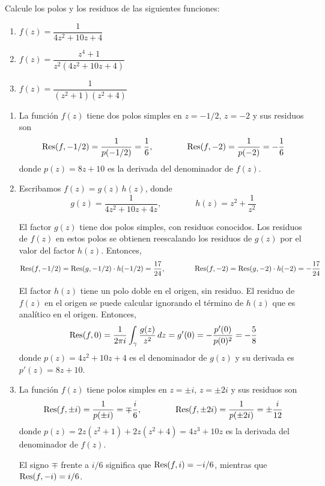 \begin{exercise}
Calcule los polos y los residuos de las siguientes funciones:
\begin{enumerate}[label=(\alph*)]
    \item $f(z) = \dfrac 1 {4z^2 + 10z + 4}$
    \item $f(z) = \dfrac {z^4 + 1} {z^2 (4z^2 + 10z + 4)}$
    \item $f(z) = \dfrac 1 {(z^2 + 1) (z^2 + 4)}$
\end{enumerate}
\end{exercise}

\begin{solution}
\leavevmode
\begin{enumerate}[label=(\alph*)]
    \item La función $f(z)$ tiene dos polos simples en $z = -1/2$, $z = -2$ y sus residuos son
    $$
    \operatorname{Res}(f, -1/2) = \frac 1 {p(-1/2)} = \frac 16, \qquad \qquad
    \operatorname{Res}(f, -2) = \frac 1 {p(-2)} = -\frac 16
    $$
    donde $p(z) = 8z + 10$ es la derivada del denominador de $f(z)$.
    
    \item Escribamos $f(z) = g(z) \, h(z)$, donde
    $$g(z) = \frac 1 {4z^2 + 10z + 4z}, \qquad \qquad h(z) = z^2 + \frac 1 {z^2}$$
    
    El factor $g(z)$ tiene dos polos simples, con residuos conocidos. Los residuos de $f(z)$ en estos polos se obtienen reescalando los residuos de $g(z)$ por el valor del factor $h(z)$. Entonces,
    $$
    \operatorname{Res}(f, -1/2) = \operatorname{Res}(g, -1/2) \cdot h(-1/2) = \frac {17} {24}, \qquad \qquad
    \operatorname{Res}(f, -2) = \operatorname{Res}(g, -2) \cdot h(-2) = -\frac {17} {24}
    $$
    
    El factor $h(z)$ tiene un polo doble en el origen, sin residuo. El residuo de $f(z)$ en el origen se puede calcular ignorando el término de $h(z)$ que es analítico en el origen. Entonces,
    $$
    \operatorname{Res}(f, 0)
        = \frac 1 {2\pi i} \int_\gamma \frac {g(z)} {z^2} \, dz
        = g'(0)
        = -\frac {p'(0)} {p(0)^2}
        = -\frac 58
    $$
    donde $p(z) = 4z^2 + 10z + 4$ es el denominador de $g(z)$ y su derivada es $p'(z) = 8z + 10$.
    
    \item La función $f(z)$ tiene polos simples en $z = \pm i$, $z = \pm 2i$ y sus residuos son
    $$
    \operatorname{Res}(f, \pm i) = \frac 1 {p(\pm i)} = \mp \frac i6, \qquad \qquad
    \operatorname{Res}(f, \pm 2i) = \frac 1 {p(\pm 2i)} = \pm \frac i {12}
    $$
    donde $p(z) = 2z (z^2 + 1) + 2z (z^2 + 4) = 4z^3 + 10z$ es la derivada del denominador de $f(z)$.
    
    \begin{remark}
    El signo $\mp$ frente a $i/6$ significa que $\operatorname{Res}(f, i) = -i/6$, mientras que $\operatorname{Res}(f, -i) = i/6$.
    \end{remark}
\end{enumerate}
\end{solution}
